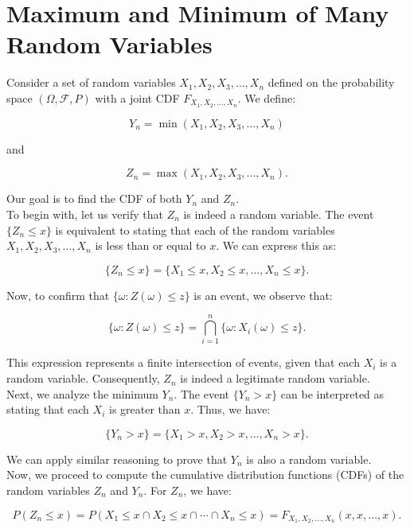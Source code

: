 \section{Maximum and Minimum of Many Random Variables}

Consider a set of random variables \( X_1, X_2, X_3, \ldots, X_n \) defined on the probability space \( (\Omega, \mathcal{F}, P) \) with a joint CDF \( F_{X_1, X_2, \ldots, X_n} \). We define:

\[
Y_n = \min(X_1, X_2, X_3, \ldots, X_n)
\]

and 

\[
Z_n = \max(X_1, X_2, X_3, \ldots, X_n).
\]

Our goal is to find the CDF of both \( Y_n \) and \( Z_n \). \\

To begin with, let us verify that \( Z_n \) is indeed a random variable. The event \( \{ Z_n \leq x \} \) is equivalent to stating that each of the random variables \( X_1, X_2, X_3, \ldots, X_n \) is less than or equal to \( x \). We can express this as:

\[
\{ Z_n \leq x \} = \{ X_1 \leq x, X_2 \leq x, \ldots, X_n \leq x \}.
\]

Now, to confirm that \( \{ \omega : Z(\omega) \leq z \} \) is an event, we observe that:

\[
\{ \omega : Z(\omega) \leq z \} = \bigcap_{i=1}^n \{ \omega : X_i(\omega) \leq z \}.
\]

This expression represents a finite intersection of events, given that each \( X_i \) is a random variable. Consequently, \( Z_n \) is indeed a legitimate random variable.\\

Next, we analyze the minimum \( Y_n \). The event \( \{ Y_n > x \} \) can be interpreted as stating that each \( X_i \) is greater than \( x \). Thus, we have:

\[
\{ Y_n > x \} = \{ X_1 > x, X_2 > x, \ldots, X_n > x \}.
\]

We can apply similar reasoning to prove that \( Y_n \) is also a random variable. \\

Now, we proceed to compute the cumulative distribution functions (CDFs) of the random variables \( Z_n \) and \( Y_n \). For \( Z_n \), we have:

\[
P(Z_n \leq x) = P(X_1 \leq x \cap X_2 \leq x \cap \cdots \cap X_n \leq x) = F_{X_1, X_2, \ldots, X_n}(x, x, \ldots, x).
\]

